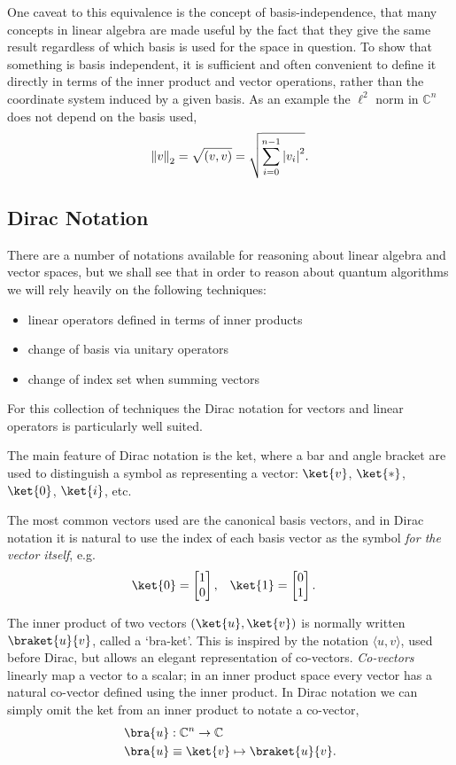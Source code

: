One caveat to this equivalence is the concept of basis-independence, that many concepts in linear algebra are made useful by the fact that they give the same result regardless of which basis is used for the space in question. To show that something is basis independent, it is sufficient and often convenient to define it directly in terms of the inner product and vector operations, rather than the coordinate system induced by a given basis. As an example the $\ell^2$ norm in $\mathbb{C}^n$ does not depend on the basis used,
\[\left\Vert v \right\Vert_2 = \sqrt{(v, v)} = \sqrt{\sum_{i=0}^{n-1}\left| v_i \right|^2}.\]

\subsection{Dirac Notation}\label{dirac}
There are a number of notations available for reasoning about linear algebra and vector spaces, but we shall see that in order to reason about quantum algorithms we will rely heavily on the following techniques:
\begin{itemize}
	\item linear operators defined in terms of inner products
	\item change of basis via unitary operators
	\item change of index set when summing vectors
\end{itemize}
For this collection of techniques the Dirac notation for vectors and linear operators is particularly well suited.

The main feature of Dirac notation is the ket, where a bar and angle bracket are used to distinguish a symbol as representing a vector: $\ket{v}$, $\ket{*}$, $\ket{0}$, $\ket{i}$, etc.

The most common vectors used are the canonical basis vectors, and in Dirac notation it is natural to use the index of each basis vector as the symbol \textit{for the vector itself}, e.g.
\begin{align*}
	\ket{0} = \left[\begin{matrix}
		1\\
		0
	\end{matrix}\right],
	&&&
	\ket{1} = \left[\begin{matrix}
		0\\
		1
	\end{matrix}\right].
\end{align*}

The inner product of two vectors $(\ket{u}, \ket{v})$ is normally written $\braket{u}{v}$, called a `bra-ket'. This is inspired by the notation $\langle u, v\rangle$, used before Dirac, but allows an elegant representation of co-vectors. \emph{Co-vectors} linearly map a vector to a scalar; in an inner product space every vector has a natural co-vector defined using the inner product. In Dirac notation we can simply omit the ket from an inner product to notate a co-vector,
\begin{align*}
	\bra{u} &: \mathbb{C}^n \to \mathbb{C}
	\\\bra{u} &\equiv \ket{v} \mapsto \braket{u}{v}.
\end{align*}

